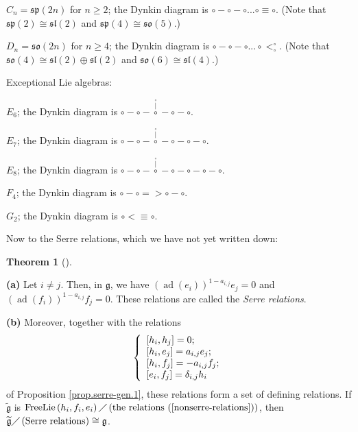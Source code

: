 \documentclass
[numbers=enddot,12pt,final,onecolumn,german,notitlepage]{scrartcl}%
\theoremstyle{definition}
\newtheorem{theo}{Theorem}
\newenvironment{theorem}[1][]
{\begin{theo}[#1]\begin{leftbar}}
{\end{leftbar}\end{theo}}
\begin{document}
$C_{n}=\mathfrak{sp}\left(  2n\right)  $ for $n\geq2$; the Dynkin diagram is
$\circ-\circ-\circ...\circ\equiv\circ$. (Note that $\mathfrak{sp}\left(
2\right)  \cong\mathfrak{sl}\left(  2\right)  $ and $\mathfrak{sp}\left(
4\right)  \cong\mathfrak{so}\left(  5\right)  $.)

$D_{n}=\mathfrak{so}\left(  2n\right)  $ for $n\geq4$; the Dynkin diagram is
$\circ-\circ-\circ...\circ<_{\circ}^{\circ}$. (Note that $\mathfrak{so}\left(
4\right)  \cong\mathfrak{sl}\left(  2\right)  \oplus\mathfrak{sl}\left(
2\right)  $ and $\mathfrak{so}\left(  6\right)  \cong\mathfrak{sl}\left(
4\right)  $.)

Exceptional Lie algebras:

$E_{6}$; the Dynkin diagram is $\circ-\circ-\overset{\overset{\circ}{\mid
}}{\circ}-\circ-\circ$.

$E_{7}$; the Dynkin diagram is $\circ-\circ-\overset{\overset{\circ}{\mid
}}{\circ}-\circ-\circ-\circ$.

$E_{8}$; the Dynkin diagram is $\circ-\circ-\overset{\overset{\circ}{\mid
}}{\circ}-\circ-\circ-\circ-\circ$.

$F_{4}$; the Dynkin diagram is $\circ-\circ=>\circ-\circ$.

$G_{2}$; the Dynkin diagram is $\circ<\equiv\circ$.

Now to the Serre relations, which we have not yet written down:

\begin{theorem}
\label{thm.serre-gen.2}\textbf{(a)} Let $i\neq j$. Then, in $\mathfrak{g}$, we
have $\left(  \operatorname*{ad}\left(  e_{i}\right)  \right)  ^{1-a_{i,j}%
}e_{j}=0$ and $\left(  \operatorname*{ad}\left(  f_{i}\right)  \right)
^{1-a_{i,j}}f_{j}=0$. These relations are called the \textit{Serre relations}.

\textbf{(b)} Moreover, together with the relations%
\begin{equation}
\left\{
\begin{array}
[c]{l}%
\left[  h_{i},h_{j}\right]  =0;\\
\left[  h_{i},e_{j}\right]  =a_{i,j}e_{j};\\
\left[  h_{i},f_{j}\right]  =-a_{i,j}f_{j};\\
\left[  e_{i},f_{j}\right]  =\delta_{i,j}h_{i}%
\end{array}
\right.  \label{nonserre-relations}%
\end{equation}
of Proposition \ref{prop.serre-gen.1}, these relations form a set of defining
relations. If $\widetilde{\mathfrak{g}}$ is $\operatorname*{FreeLie}\left(
h_{i},f_{i},e_{i}\right)  \diagup\left(  \text{the relations
(\ref{nonserre-relations})}\right)  $, then $\widetilde{\mathfrak{g}}%
\diagup\left(  \text{Serre relations}\right)  \cong\mathfrak{g}$.
\end{theorem}
\end{document}
